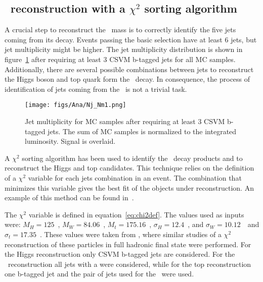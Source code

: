 \subsection{\Tp~reconstruction with a $\chi^{2}$ sorting algorithm}
\label{sec:chi2}

A crucial step to reconstruct the \Tp~mass is to correctly identify the five jets coming from its decay. Events passing the basic selection have at least 6 jets, but jet multiplicity might be higher. The jet multiplicity distribution is shown in figure~\ref{fig:Nj} after requiring at least 3 CSVM b-tagged jets for all MC samples. Additionally, there are several possible combinations between jets to reconstruct the Higgs boson and top quark form the \Tp~decay. In consequence, the process of identification of jets coming from the \Tp~is not a trivial task. 

\begin{figure}[!Hhtbp]
  \begin{center}
    \texttt{[image: figs/Ana/Nj\_Nm1.png]}
    \caption{Jet multiplicity for MC samples after requiring at least 3 CSVM b-tagged jets. The sum of MC samples is normalized to the integrated luminosity. Signal is overlaid.}
    \label{fig:Nj}
  \end{center}
\end{figure}

A $\chi^{2}$ sorting algorithm has been used to identify the \Tp~decay products and to reconstruct the Higgs and top candidates. This technique relies on the definition of a $\chi^{2}$ variable for each jets combination in an event. The combination that minimizes this variable gives the best fit of the objects under reconstruction. An example of this method can be found in~\cite{Brochet:1956723}. 

The $\chi^{2}$ variable is defined in equation~\ref{eq:chi2def}. The values used as inputs were: $M_{H}=125$~\GeVcc, $M_{W}=84.06$~\GeVcc, $M_{t}=175.16$~\GeVcc, $\sigma_{H}=12.4$~\GeVcc, and $\sigma_{W}=10.12$~\GeVcc~and $\sigma_{t}=17.35$~\GeVcc. These values were taken from \cite{Brochet:1956723,Chatrchyan:2013zna}, where similar studies of a $\chi^{2}$ reconstruction of these particles in full hadronic final state were performed. For the Higgs reconstruction only CSVM b-tagged jets are considered. For the \W~reconstruction all jets with a  were considered, while for the top reconstruction one b-tagged jet and the pair of jets used for the \W~were used. %

